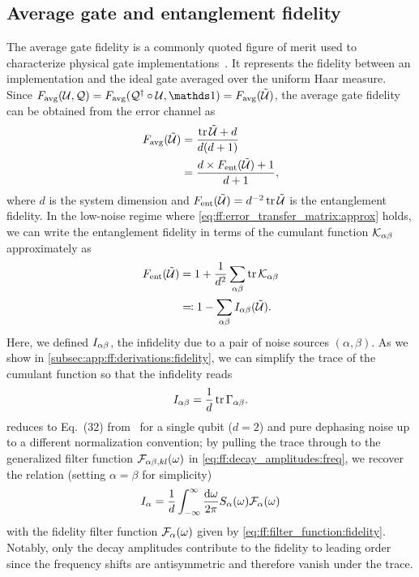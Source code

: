 \subsection{Average gate and entanglement fidelity}\label{subsec:ff:theory:derived_quantities:entanglement_fidelity}
The average gate fidelity is a commonly quoted figure of merit used to characterize physical gate implementations~\cite{Loss1998,Ladd2010,Chow2012,Veldhorst2014,Yoneda2018}.
It represents the fidelity between an implementation \liouvU and the ideal gate \liouvQ averaged over the uniform Haar measure.
Since $\avgfid(\liouvU, \liouvQ) = \avgfid(\liouvQ\adjoint\circ\liouvU, \eye) = \avgfid(\liouvUe)$, the average gate fidelity can be obtained from the error channel \liouvUe as~\cite{Horodecki1999,Nielsen2002}
\begin{align}
    F_{\mathrm{avg}}(\mathcal{\tilde{U}}) &= \frac{\tr\mathcal{\tilde{U}} + d}{d(d+1)} \label{eq:ff:fidelity:avg}\\
    &= \frac{d\times F_{\mathrm{ent}}(\mathcal{\tilde{U}}) + 1}{d + 1}, \label{eq:ff:fidelity:avg-ent}
\end{align}
where $d$ is the system dimension and $F_{\mathrm{ent}}(\mathcal{\tilde{U}}) = d^{-2}\tr\mathcal{\tilde{U}}$ is the entanglement fidelity.
In the low-noise regime where \cref{eq:ff:error_transfer_matrix:approx} holds, we can write the entanglement fidelity in terms of the cumulant function $\mathcal{K}_{\alpha\beta}$ approximately as
\begin{align}\label{eq:ff:fidelity:ent}
F_{\mathrm{ent}}(\mathcal{\tilde{U}}) &= 1 + \frac{1}{d^2}\sum_{\alpha\beta}\tr\mathcal{K}_{\alpha\beta} \\
&\eqqcolon 1 - \sum_{\alpha\beta}I_{\alpha\beta}(\mathcal{\tilde{U}}).
\end{align}
Here, we defined $I_{\alpha\beta}$, the infidelity due to a pair of noise sources $(\alpha,\beta)$.
As we show in \cref{subsec:app:ff:derivations:fidelity}, we can simplify the trace of the cumulant function so that the infidelity reads
\begin{equation}\label{eq:ff:infidelity:ent}
I_{\alpha\beta} = \frac{1}{d}\tr\Gamma_{\alpha\beta}.
\end{equation}
 reduces to Eq.~(32) from~ for a single qubit ($d=2$) and pure dephasing noise up to a different normalization convention; by pulling the trace through to the generalized filter function $\mathcal{F}_{\alpha\beta,kl}(\omega)$ in \cref{eq:ff:decay_amplitudes:freq}, we recover the relation (setting $\alpha=\beta$ for simplicity)
\begin{equation}\label{eq:ff:infidelity:ent:integral}
I_{\alpha} = \frac{1}{d}\int_{-\infty}^\infty\frac{\dd{\omega}}{2\pi} S_{\alpha}(\omega) \mathcal{F}_{\alpha}(\omega)
\end{equation}
with the fidelity filter function $\mathcal{F}_{\alpha}(\omega)$ given by \cref{eq:ff:filter_function:fidelity}.
Notably, only the decay amplitudes \decayamps contribute to the fidelity to leading order since the frequency shifts \freqshifts are antisymmetric and therefore vanish under the trace.

